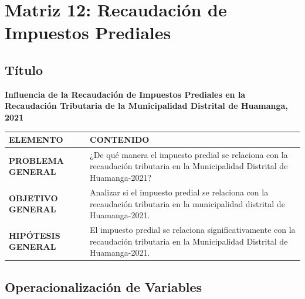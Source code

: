 \documentclass[
  man,
  floatsintext,
  longtable,
  a4paper,
  nolmodern,
  notxfonts,
  notimes,
  12pt,
  colorlinks=true,linkcolor=blue,citecolor=blue,urlcolor=blue]{apa7}
\newcounter{none} %
\begin{document}
\section{Matriz 12: Recaudación de Impuestos
Prediales}\label{matriz-12-recaudaciuxf3n-de-impuestos-prediales}

\subsection{Título}\label{tuxedtulo-11}

\textbf{Influencia de la Recaudación de Impuestos Prediales en la
Recaudación Tributaria de la Municipalidad Distrital de Huamanga, 2021}

{\def\LTcaptype{none} %
\begin{longtable}[]{@{}
  >{\raggedright\arraybackslash}p{}
  >{\raggedright\arraybackslash}p{}@{}}
\toprule\noalign{}
\begin{minipage}[b]{\linewidth}\raggedright
ELEMENTO
\end{minipage} & \begin{minipage}[b]{\linewidth}\raggedright
CONTENIDO
\end{minipage} \\
\midrule\noalign{}
\endhead
\bottomrule\noalign{}
\endlastfoot
\textbf{PROBLEMA GENERAL} & ¿De qué manera el impuesto predial se
relaciona con la recaudación tributaria en la Municipalidad Distrital de
Huamanga-2021? \\
\textbf{OBJETIVO GENERAL} & Analizar si el impuesto predial se relaciona
con la recaudación tributaria en la municipalidad distrital de
Huamanga-2021. \\
\textbf{HIPÓTESIS GENERAL} & El impuesto predial se relaciona
significativamente con la recaudación tributaria en la Municipalidad
Distrital de Huamanga-2021. \\
\end{longtable}
}

\subsection{Operacionalización de
Variables}\label{operacionalizaciuxf3n-de-variables-1}
\end{document}
